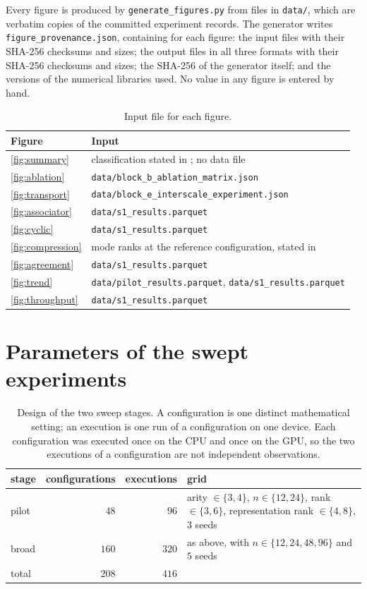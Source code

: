\documentclass[11pt]{amsart}
\begin{document}
Every figure is produced by \texttt{generate\_figures.py} from files in \texttt{data/},
which are verbatim copies of the committed experiment records. The generator writes
\texttt{figure\_provenance.json}, containing for each figure: the input files with their
SHA-256 checksums and sizes; the output files in all three formats with their SHA-256
checksums and sizes; the SHA-256 of the generator itself; and the versions of the numerical
libraries used. No value in any figure is entered by hand.

\begin{table}[h]
\centering\small
\caption{Input file for each figure.}
\label{tab:sources}
\begin{tabularx}{\linewidth}{@{}lX@{}}
\toprule
Figure & Input \\
\midrule
\ref{fig:summary} & classification stated in \cite{ChaveroJassoNumerical}; no data file \\
\ref{fig:ablation} & \texttt{data/block\_b\_ablation\_matrix.json} \\
\ref{fig:transport} & \texttt{data/block\_e\_interscale\_experiment.json} \\
\ref{fig:associator} & \texttt{data/s1\_results.parquet} \\
\ref{fig:cyclic} & \texttt{data/s1\_results.parquet} \\
\ref{fig:compression} & mode ranks at the reference configuration, stated in \cite{ChaveroJassoNumerical} \\
\ref{fig:agreement} & \texttt{data/s1\_results.parquet} \\
\ref{fig:trend} & \texttt{data/pilot\_results.parquet}, \texttt{data/s1\_results.parquet} \\
\ref{fig:throughput} & \texttt{data/s1\_results.parquet} \\
\bottomrule
\end{tabularx}
\end{table}

\section{Parameters of the swept experiments}
\label{sec:params}

\begin{table}[h]
\centering\small
\caption{Design of the two sweep stages. A configuration is one distinct mathematical
setting; an execution is one run of a configuration on one device. Each configuration was
executed once on the CPU and once on the GPU, so the two executions of a configuration are
not independent observations.}
\label{tab:design}
\begin{tabularx}{\linewidth}{@{}lrrX@{}}
\toprule
stage & configurations & executions & grid \\
\midrule
pilot & $48$ & $96$ & arity $\in\{3,4\}$, $n\in\{12,24\}$, rank $\in\{3,6\}$,
representation rank $\in\{4,8\}$, $3$ seeds \\
broad & $160$ & $320$ & as above, with $n\in\{12,24,48,96\}$ and $5$ seeds \\
\midrule
total & $208$ & $416$ & \\
\bottomrule
\end{tabularx}
\end{table}
\end{document}
